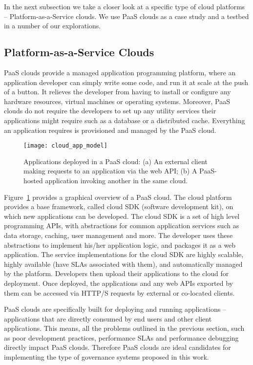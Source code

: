 In the next subsection we take a closer look at a specific type of cloud platforms -- Platform-as-a-Service clouds.
We use PaaS clouds as a case study and a testbed in a number of our explorations.

\subsection{Platform-as-a-Service Clouds}
PaaS clouds provide a managed application programming platform, where an application developer can simply 
write some code, and run it at scale at the push of a button. It relieves the developer from having to install or configure
any hardware resources, virtual machines or operating systems. Moreover, PaaS clouds do not require the developers
to set up any utility services their applications might require such as a database or a distributed cache. 
Everything an application requires is provisioned and managed by the PaaS cloud.

\begin{figure}
\centering
\texttt{[image: cloud\_app\_model]}
\caption{Applications deployed in a PaaS cloud: (a) An external client making requests
to an application via the web API;
(b) A PaaS-hosted application invoking another in the same cloud.
\label{fig:cloud_app_model}
}
\vspace{-0.2in}
\end{figure}

Figure~\ref{fig:cloud_app_model} provides a graphical overview of a PaaS cloud. 
The cloud platform provides a base 
framework, called cloud SDK (software development kit), on which new applications can be developed. 
The cloud SDK 
is a set of high level programming APIs, with abstractions for common application services such as data storage, caching, 
user management and more. The developer uses these abstractions to implement his/her application logic, and packages 
it as a web application. The service implementations for the 
cloud SDK are highly scalable, highly available (have SLAs associated with them),
and automatically managed by the platform. Developers then
upload their applications to the cloud for deployment.
Once deployed, the applications and any web APIs exported by them can be accessed 
via HTTP/S requests by external or co-located clients.

PaaS clouds are specifically built for deploying and running applications -- 
applications that are directly consumed by end users and other client applications. This means, all the problems 
outlined in the previous section, such as poor development practices, performance SLAs and performance 
debugging directly impact PaaS clouds. Therefore PaaS clouds are ideal candidates for implementing the type
of governance systems proposed in this work. 

